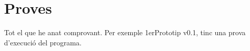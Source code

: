 \section{Proves}
Tot el que he anat comprovant.
Per exemple 1erPrototip v0.1, tinc una prova d'execució del programa.